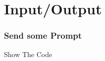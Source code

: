 \documentclass[
	11pt, %
]{beamer}
\begin{document}

\section{Input/Output}


\begin{frame}[plain] %
	\frametitle{Send some Prompt}
	\begin{center}
		{\Huge Show The Code}
		
		\bigskip\bigskip %
	
	\end{center}
\end{frame}
\end{document}
